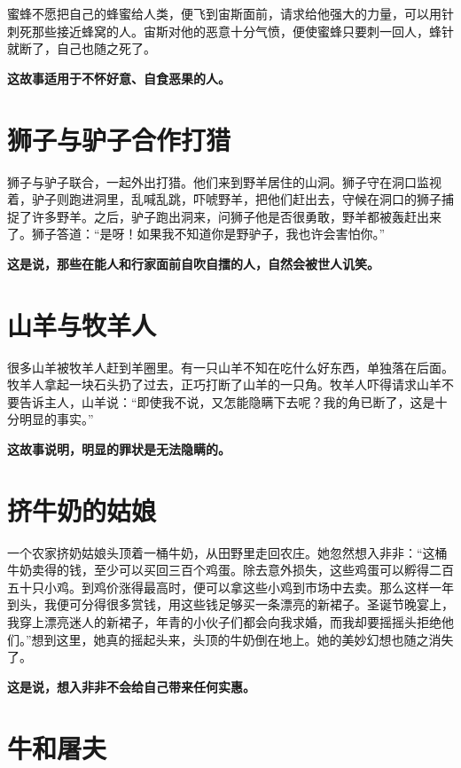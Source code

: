 蜜蜂不愿把自己的蜂蜜给人类，便飞到宙斯面前，请求给他强大的力量，可以用针刺死那些接近蜂窝的人。宙斯对他的恶意十分气愤，便使蜜蜂只要刺一回人，蜂针就断了，自己也随之死了。

{\bfseries \color{red}这故事适用于不怀好意、自食恶果的人。}

\section{狮子与驴子合作打猎}

狮子与驴子联合，一起外出打猎。他们来到野羊居住的山洞。狮子守在洞口监视着，驴子则跑进洞里，乱喊乱跳，吓唬野羊，把他们赶出去，守候在洞口的狮子捕捉了许多野羊。之后，驴子跑出洞来，问狮子他是否很勇敢，野羊都被轰赶出来了。狮子答道：“是呀！如果我不知道你是野驴子，我也许会害怕你。”

{\bfseries \color{red}这是说，那些在能人和行家面前自吹自擂的人，自然会被世人讥笑。}

\section{山羊与牧羊人}

很多山羊被牧羊人赶到羊圈里。有一只山羊不知在吃什么好东西，单独落在后面。牧羊人拿起一块石头扔了过去，正巧打断了山羊的一只角。牧羊人吓得请求山羊不要告诉主人，山羊说：“即使我不说，又怎能隐瞒下去呢？我的角已断了，这是十分明显的事实。”

{\bfseries \color{red}这故事说明，明显的罪状是无法隐瞒的。}

\section{挤牛奶的姑娘}

一个农家挤奶姑娘头顶着一桶牛奶，从田野里走回农庄。她忽然想入非非：“这桶牛奶卖得的钱，至少可以买回三百个鸡蛋。除去意外损失，这些鸡蛋可以孵得二百五十只小鸡。到鸡价涨得最高时，便可以拿这些小鸡到市场中去卖。那么这样一年到头，我便可分得很多赏钱，用这些钱足够买一条漂亮的新裙子。圣诞节晚宴上，我穿上漂亮迷人的新裙子，年青的小伙子们都会向我求婚，而我却要摇摇头拒绝他们。”想到这里，她真的摇起头来，头顶的牛奶倒在地上。她的美妙幻想也随之消失了。

{\bfseries \color{red}这是说，想入非非不会给自己带来任何实惠。}

\section{牛和屠夫}


